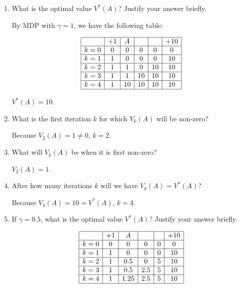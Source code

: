 \documentclass{article}
\begin{document}
\begin{enumerate}[label=(\alph*)]
    \item What is the optimal value $V^*(A)$? Justify your answer briefly.

    By MDP with $\gamma = 1$, we have the following table:

    $$
    \begin{array}{|l|c|c|c|c|c|}
        \hline
              & +1 &  A &    &    & +10 \\
        \hline
        k = 0 &  0 &  0 &  0 &  0 &   0 \\
        \hline
        k = 1 &  1 &  0 &  0 &  0 &  10 \\
        \hline
        k = 2 &  1 &  1 &  0 & 10 &  10 \\
        \hline
        k = 3 &  1 &  1 & 10 & 10 &  10 \\
        \hline
        k = 4 &  1 & 10 & 10 & 10 &  10 \\
        \hline
    \end{array}
    $$

    $V^*(A) = 10$.

    \item What is the first iteration $k$ for which $V_k(A)$ will be non-zero?

    Because $V_2(A) = 1 \ne 0$, $k = 2$.
    \item What will $V_k(A)$ be when it is first non-zero?

    $V_2(A) = 1$.

    \item After how many iterations $k$ will we have $V_k(A) = V^*(A)$?

    Because $V_4(A) = 10 = V^*(A)$, $k = 4$.

    \item If $\gamma = 0.5$, what is the optimal value $V^*(A)$? Justify your answer briefly.


    $$
    \begin{array}{|l|c|c|c|c|c|}
        \hline
              & +1&    A &     &   & +10 \\
        \hline
        k = 0 & 0 &    0 &   0 & 0 & 0 \\
        \hline
        k = 1 & 1 &    0 &   0 & 0 & 10 \\
        \hline
        k = 2 & 1 &  0.5 &   0 & 5 & 10 \\
        \hline
        k = 3 & 1 &  0.5 & 2.5 & 5 & 10 \\
        \hline
        k = 4 & 1 & 1.25 & 2.5 & 5 & 10 \\
        \hline
    \end{array}
    $$


\end{enumerate}
\end{document}

